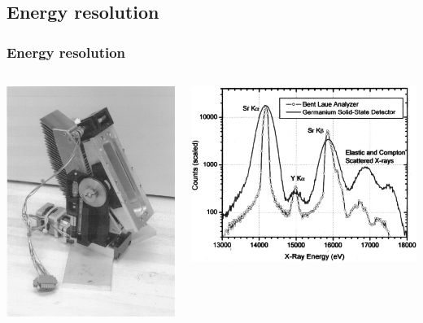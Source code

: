 \documentclass[10pt, xcolor=x11names, compress]{beamer}
\begin{document}
\subsection[Energy resolution]{Energy resolution}

\begin{frame}
  \frametitle{Energy resolution}
  \begin{columns}
    \begin{column}{0.3\linewidth}
      \includegraphics[width=0.9\linewidth]{pses/hires/bla_bw.jpg}
    \end{column}
    \begin{column}{0.35\linewidth}
      \includegraphics[width=0.9\linewidth]{pses/hires/resolution.png}      

\end{column}
\end{columns}
\end{frame}
\end{document}
